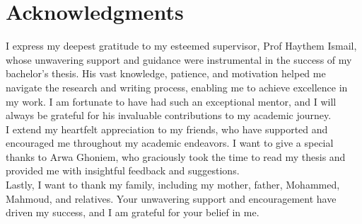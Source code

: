 \chapter*{Acknowledgments}
\label{chap:ack}

I express my deepest gratitude to my esteemed supervisor, Prof Haythem Ismail, whose unwavering support and guidance were instrumental in the success of my bachelor's thesis. His vast knowledge, patience, and motivation helped me navigate the research and writing process, enabling me to achieve excellence in my work. I am fortunate to have had such an exceptional mentor, and I will always be grateful for his invaluable contributions to my academic journey.\\

I extend my heartfelt appreciation to my friends, who have supported and encouraged me throughout my academic endeavors. I want to give a special thanks to Arwa Ghoniem, who graciously took the time to read my thesis and provided me with insightful feedback and suggestions.\\

Lastly, I want to thank my family, including my mother, father, Mohammed, Mahmoud, and relatives. Your unwavering support and encouragement have driven my success, and I am grateful for your belief in me.